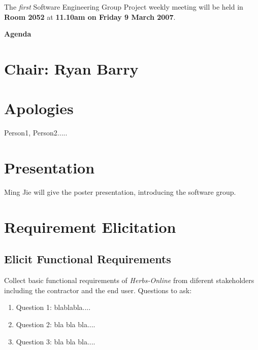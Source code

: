 \documentclass[11pt, a4paper]{article}
\begin{document}
\noindent The {\em first} Software Engineering Group Project weekly meeting will be held in {\bf Room 2052} at {\bf 11.10am on Friday 9 March 2007}.


\vspace*{15pt}

\begin{center}
\huge \bf Agenda
\end{center}



\section*{Chair: Ryan Barry}

\vspace*{10pt}

\section{Apologies}
Person1, Person2.....

\section{Presentation}
Ming Jie will give the poster presentation, introducing the software group.

\section{Requirement Elicitation}

\subsection{Elicit Functional Requirements}
Collect basic functional requirements of {\em Herbs-Online} from diferent stakeholders including the contractor and the end user. Questions to ask: 

\begin{enumerate}

\item Question 1: blablabla....

\item Question 2: bla bla bla....

\item Question 3: bla bla bla....

\end{enumerate}
 
\end{document}
